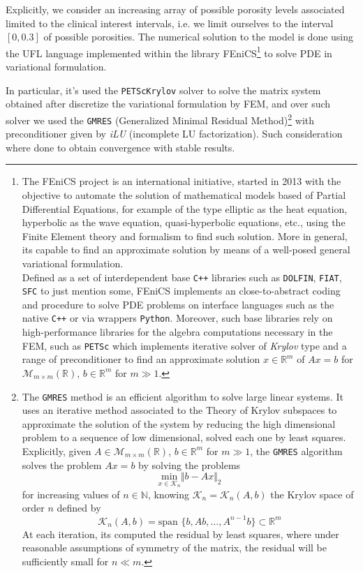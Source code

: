 Explicitly, we consider an increasing array of possible porosity levels associated limited to the clinical interest intervals, i.e. we limit ourselves to the interval $[0, 0.3]$ of possible porosities. The numerical solution to the model is done using the UFL language implemented within the library FEniCS\footnote{The FEniCS project is an international initiative, started in 2013 with the objective to automate the solution of mathematical models based of Partial Differential Equations, for example of the type elliptic as the heat equation, hyperbolic as the wave equation, quasi-hyperbolic equations, etc., using the Finite Element theory and formalism to find such solution. More in general, its capable to find an approximate solution by means of a well-posed general variational formulation. \\
Defined as a set of interdependent base \texttt{C++} libraries such as \texttt{DOLFIN}, \texttt{FIAT}, \texttt{SFC} to just mention some, FEniCS implements an close-to-abstract coding and procedure to solve PDE problems on interface languages such as the native \texttt{C++} or via wrappers \texttt{Python}. Moreover, such base libraries rely on high-performance libraries for the algebra computations necessary in the FEM, such as \texttt{PETSc} which implements iterative solver of \textit{Krylov} type and a range of preconditioner to find an approximate solution $x \in \mathbb{R}^m$ of $Ax = b$ for $\mathcal{M}_{m \times m}(\mathbb{R})$, $b \in \mathbb{R}^m$ for $m \gg 1$.} to solve PDE in variational formulation.

In particular, it's used the \texttt{PETScKrylov} solver to solve the matrix system obtained after discretize the variational formulation by FEM, and over such solver we used the \texttt{GMRES} (Generalized Minimal Residual Method)\footnote{The \texttt{GMRES} method is an efficient algorithm to solve large linear systems. It uses an iterative method associated to the Theory of Krylov subspaces to approximate the solution of the system by reducing the high dimensional problem to a sequence of low dimensional, solved each one by least squares.
Explicitly, given $A \in \mathcal{M}_{m\times m} (\mathbb{R})$, $b \in \mathbb{R}^m$ for $m\gg 1$, the \texttt{GMRES} algorithm solves the problem $A x = b$ by solving the problems 
\begin{equation*}
    \underset{x \in \mathcal{K}_n}{\text{ min }} \Vert b - Ax \Vert_2   
\end{equation*} 
for increasing values of $n \in \mathbb{N}$, knowing $\mathcal{K}_n = \mathcal{K}_n(A,b)$ the Krylov space of order $n$ defined by
\begin{equation*}
 \mathcal{K}_n(A,b) = \text{span }\{ b, Ab, \dots, A^{n-1}b \} \subset \mathbb{R}^m   
\end{equation*}
At each iteration, its computed the residual by least squares, where under reasonable assumptions of symmetry of the matrix, the residual will be sufficiently small for $n \ll m$.} with preconditioner given by \textit{iLU} (incomplete LU factorization). Such consideration where done to obtain convergence with stable results.

